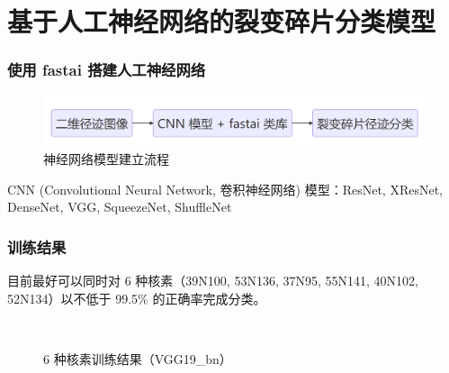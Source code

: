 \documentclass[14pt, AutoFakeBold]{ldr}
\begin{document}
\section{基于人工神经网络的裂变碎片分类模型}
\begin{frame}[c]
  \frametitle{使用 fastai 搭建人工神经网络}

  \begin{figure}[H]
    \centering
    \includegraphics[width=1.0\textwidth]{../figures/flowchart3.png}
    \caption{神经网络模型建立流程}
    \label{fig-flowchart3}
    \end{figure}
  
    CNN (Convolutional Neural Network, 卷积神经网络) 模型：ResNet, XResNet, DenseNet, VGG, SqueezeNet, ShuffleNet
\end{frame}



\begin{frame}[c]
  \frametitle{训练结果}
  目前最好可以同时对 6 种核素（39N100, 53N136, 37N95, 55N141, 40N102, 52N134）以不低于 99.5\% 的正确率完成分类。
  \begin{figure}[H]
    \centering
    \\	
      \caption{6 种核素训练结果（VGG19\_bn）}
      \label{fig_learn6_vgg19-bn}
  \end{figure}
  
\end{frame}
\end{document}
